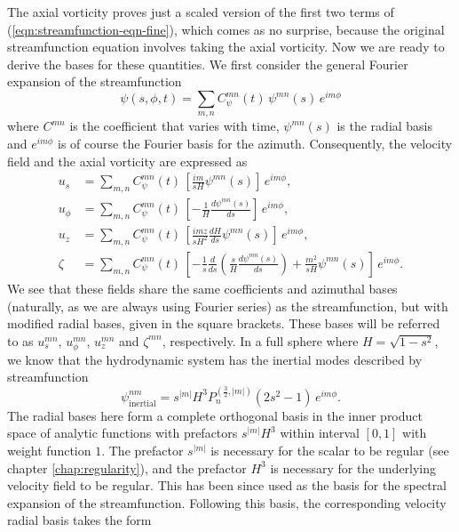 The axial vorticity proves just a scaled version of the first two terms of (\ref{eqn:streamfunction-eqn-fine}), which comes as no surprise, because the original streamfunction equation involves taking the axial vorticity.
Now we are ready to derive the bases for these quantities. We first consider the general Fourier expansion of the streamfunction
\[
    \psi(s, \phi, t) = \sum_{m,n} C_{\psi}^{mn}(t) \, \psi^{mn}(s) \, e^{im\phi}
\]
where $C^{mn}$ is the coefficient that varies with time, $\psi^{mn}(s)$ is the radial basis and $e^{im\phi}$ is of course the Fourier basis for the azimuth.
Consequently, the velocity field and the axial vorticity are expressed as
\begin{equation}
\begin{aligned}
    u_s &= \sum_{m,n} C_\psi^{mn}(t) \, \left[\frac{im}{sH} \psi^{mn}(s)\right] \, e^{im\phi}, \\ 
    u_\phi &= \sum_{m,n} C_\psi^{mn}(t) \, \left[-\frac{1}{H} \frac{d\psi^{mn}(s)}{ds}\right] \, e^{im\phi}, \\
    u_z &= \sum_{m,n} C_\psi^{mn}(t) \, \left[\frac{imz}{sH^2} \frac{dH}{ds} \psi^{mn}(s)\right] \, e^{im\phi}, \\
    \zeta &= \sum_{m,n} C_\psi^{mn}(t) \, \left[-\frac{1}{s}\frac{d}{ds} \left(\frac{s}{H} \frac{d\psi^{mn}(s)}{ds}\right) + \frac{m^2}{sH} \psi^{mn}(s)\right] \, e^{im\phi}.
\end{aligned}
\end{equation}
We see that these fields share the same coefficients and azimuthal bases (naturally, as we are always using Fourier series) as the streamfunction, but with modified radial bases, given in the square brackets. These bases will be referred to as $u_s^{mn}$, $u_\phi^{mn}$, $u_z^{mn}$ and $\zeta^{mn}$, respectively.
In a full sphere where $H=\sqrt{1 - s^2}$, we know that the hydrodynamic system has the inertial modes described by streamfunction
\[
    \psi_\mathrm{inertial}^{nm} = s^{|m|} H^3 P_n^{(\frac{3}{2}, |m|)}(2s^2 - 1) \, e^{im\phi}.
\]
The radial bases here form a complete orthogonal basis in the inner product space of analytic functions with prefactors $s^{|m|} H^3$ within interval $[0, 1]$ with weight function $1$. The prefactor $s^{|m|}$ is necessary for the scalar to be regular (see chapter \ref{chap:regularity}), and the prefactor $H^3$ is necessary for the underlying velocity field to be regular. This has been since used as the basis for the spectral expansion of the streamfunction. Following this basis, the corresponding velocity radial basis takes the form
%
